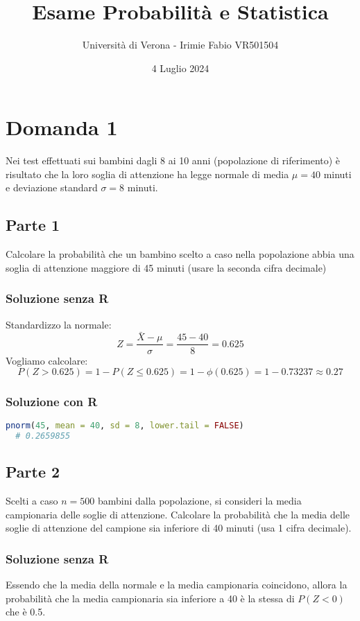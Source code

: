 \documentclass[a4paper]{article}
\theoremstyle{break}
\theoremstyle{break}
\theoremstyle{break}
\theoremstyle{break}
\begin{document}
\title{Esame Probabilità e Statistica}
\author{Università di Verona - Irimie Fabio VR501504}
\date{4 Luglio 2024}
\maketitle

\tableofcontents
\pagebreak

\section{Domanda 1}
Nei test effettuati sui bambini dagli 8 ai 10 anni (popolazione
di riferimento) è risultato che la loro soglia di attenzione ha
legge normale di media \( \mu = 40 \)  minuti e deviazione standard  
\( \sigma = 8 \)  minuti.

\subsection{Parte 1}
Calcolare la probabilità che un bambino scelto a caso nella
popolazione abbia una soglia di attenzione maggiore di 45 minuti
(usare la seconda cifra decimale)

\subsubsection{Soluzione senza R}
Standardizzo la normale:
\[
  Z = \frac{\bar{X} - \mu}{\sigma} = \frac{45 - 40}{8} = 0.625
\] 
Vogliamo calcolare:
\[
P(Z > 0.625) = 1 - P(Z \le 0.625) = 1 - \phi(0.625) = 1 - 0.73237 \approx 0.27
\] 

\subsubsection{Soluzione con R}
\begin{lstlisting}[language=R]
  pnorm(45, mean = 40, sd = 8, lower.tail = FALSE)
  # 0.2659855
\end{lstlisting}

\subsection{Parte 2}
Scelti a caso \( n=500 \) bambini dalla popolazione, si consideri la
media campionaria delle soglie di attenzione. Calcolare la 
probabilità che la media  delle soglie di attenzione del 
campione sia inferiore di 40 minuti (usa 1 cifra decimale).

\subsubsection{Soluzione senza R}
Essendo che la media della normale e la media campionaria coincidono,
allora la probabilità che la media campionaria sia inferiore a 40
è la stessa di \( P(Z < 0) \) che è 0.5.
\end{document}
